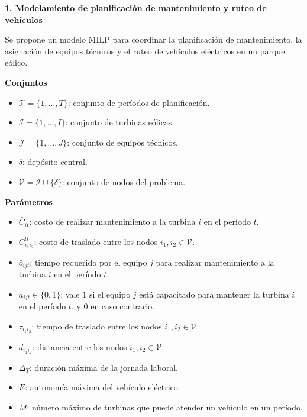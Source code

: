 \medskip
\noindent\textbf{1.\; Modelamiento de planificación de mantenimiento y ruteo de vehículos}\par

Se propone un modelo MILP para coordinar la planificación de mantenimiento,
la asignación de equipos técnicos y el ruteo de vehículos eléctricos en un
parque eólico.

\medskip
\noindent\textbf{Conjuntos}\par

\begin{itemize}
    \item $\mathcal{T}=\{1,\dots,T\}$: conjunto de períodos de planificación.
    \item $\mathcal{I}=\{1,\dots,I\}$: conjunto de turbinas eólicas.
    \item $\mathcal{J}=\{1,\dots,J\}$: conjunto de equipos técnicos.
    \item $\delta$: depósito central.
    \item $\mathcal{V}=\mathcal{I}\cup\{\delta\}$: conjunto de nodos del problema.
\end{itemize}

\medskip
\noindent\textbf{Parámetros}\par

\begin{itemize}
    \item $\bar{C}_{it}$: costo de realizar mantenimiento a la turbina $i$ en el período $t$.
    \item $C^{tl}_{i_1 i_2}$: costo de traslado entre los nodos $i_1,i_2\in\mathcal{V}$.
    \item $\bar{o}_{ijt}$: tiempo requerido por el equipo $j$ para realizar mantenimiento a la turbina $i$ en el período $t$.
    \item $a_{ijt}\in\{0,1\}$: vale $1$ si el equipo $j$ está capacitado para mantener la turbina $i$ en el período $t$, y $0$ en caso contrario.
    \item $\tau_{i_1 i_2}$: tiempo de traslado entre los nodos $i_1,i_2\in\mathcal{V}$.
    \item $d_{i_1 i_2}$: distancia entre los nodos $i_1,i_2\in\mathcal{V}$.
    \item $\Delta_T$: duración máxima de la jornada laboral.
    \item $E$: autonomía máxima del vehículo eléctrico.
    \item $M$: número máximo de turbinas que puede atender un vehículo en un período.
\end{itemize}

